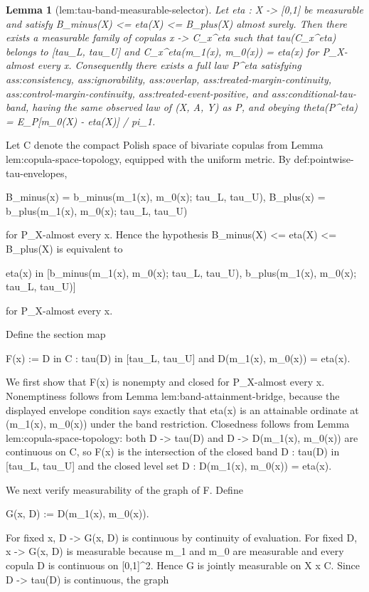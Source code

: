 \documentclass{article}
\newtheorem{lemma}{Lemma}
\begin{document}
\begin{lemma}[lem:tau-band-measurable-selector]\label{lem:tau-band-measurable-selector}
Let eta : X -> [0,1] be measurable and satisfy B_minus(X) <= eta(X) <= B_plus(X) almost surely. Then there exists a measurable family of copulas x -> C_x^eta such that tau(C_x^eta) belongs to [tau_L, tau_U] and C_x^eta(m_1(x), m_0(x)) = eta(x) for P_X-almost every x. Consequently there exists a full law P^eta satisfying ass:consistency, ass:ignorability, ass:overlap, ass:treated-margin-continuity, ass:control-margin-continuity, ass:treated-event-positive, and ass:conditional-tau-band, having the same observed law of (X, A, Y) as P, and obeying theta(P^eta) = E_P[m_0(X) - eta(X)] / pi_1.
\end{lemma}
Let C denote the compact Polish space of bivariate copulas from Lemma lem:copula-space-topology, equipped with the uniform metric. By def:pointwise-tau-envelopes,

B_minus(x) = b_minus(m_1(x), m_0(x); tau_L, tau_U),
B_plus(x) = b_plus(m_1(x), m_0(x); tau_L, tau_U)

for P_X-almost every x. Hence the hypothesis B_minus(X) <= eta(X) <= B_plus(X) is equivalent to

eta(x) in [b_minus(m_1(x), m_0(x); tau_L, tau_U), b_plus(m_1(x), m_0(x); tau_L, tau_U)]

for P_X-almost every x.

Define the section map

F(x) := {D in C : tau(D) in [tau_L, tau_U] and D(m_1(x), m_0(x)) = eta(x)}.

We first show that F(x) is nonempty and closed for P_X-almost every x. Nonemptiness follows from Lemma lem:band-attainment-bridge, because the displayed envelope condition says exactly that eta(x) is an attainable ordinate at (m_1(x), m_0(x)) under the band restriction. Closedness follows from Lemma lem:copula-space-topology: both D -> tau(D) and D -> D(m_1(x), m_0(x)) are continuous on C, so F(x) is the intersection of the closed band {D : tau(D) in [tau_L, tau_U]} and the closed level set {D : D(m_1(x), m_0(x)) = eta(x)}.

We next verify measurability of the graph of F. Define

G(x, D) := D(m_1(x), m_0(x)).

For fixed x, D -> G(x, D) is continuous by continuity of evaluation. For fixed D, x -> G(x, D) is measurable because m_1 and m_0 are measurable and every copula D is continuous on [0,1]^2. Hence G is jointly measurable on X x C. Since D -> tau(D) is continuous, the graph
\end{document}
